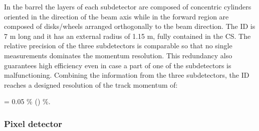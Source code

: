 In the barrel the layers of each subdetector are composed of concentric cylinders oriented in the direction of the beam axis while in the forward region are composed of disks/wheels arranged orthogonally to the beam direction. The ID is 7 m long and it has an external radius of 1.15 m, fully contained in the CS. The relative precision of the three subdetectors is comparable so that no single measurements dominates the momentum resolution. This redundancy also guarantees high efficiency even in case a part of one of the subdetectors is malfunctioning. Combining the information from the three subdetectors, the ID reaches a designed resolution of the track momentum of:

\be
\frac{\sigma_{\pt}}{\pt} = 0.05 \% \times \pt(\gev)  \%.
\label{sec:det:eq:IDresolution}
\ee



\subsubsection{Pixel detector}

